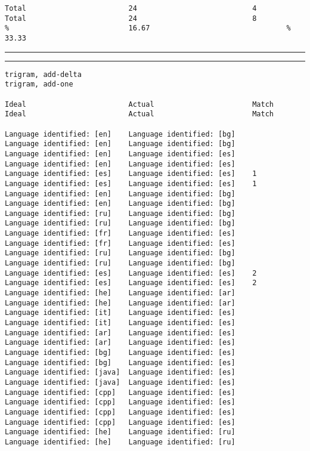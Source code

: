 \begin{verbatim}
Total                        24                           4       Total                        24                           8
%                            16.67                                %                            33.33
\end{verbatim}
\vskip4pt\hrule

\clearpage

\tiny
\hrule\vskip4pt
\begin{verbatim}
trigram, add-delta                                                trigram, add-one

Ideal                        Actual                       Match   Ideal                        Actual                       Match

Language identified: [en]    Language identified: [bg]            Language identified: [en]    Language identified: [bg]
Language identified: [en]    Language identified: [es]            Language identified: [en]    Language identified: [es]
Language identified: [es]    Language identified: [es]    1       Language identified: [es]    Language identified: [es]    1
Language identified: [en]    Language identified: [bg]            Language identified: [en]    Language identified: [bg]
Language identified: [ru]    Language identified: [bg]            Language identified: [ru]    Language identified: [bg]
Language identified: [fr]    Language identified: [es]            Language identified: [fr]    Language identified: [es]
Language identified: [ru]    Language identified: [bg]            Language identified: [ru]    Language identified: [bg]
Language identified: [es]    Language identified: [es]    2       Language identified: [es]    Language identified: [es]    2
Language identified: [he]    Language identified: [ar]            Language identified: [he]    Language identified: [ar]
Language identified: [it]    Language identified: [es]            Language identified: [it]    Language identified: [es]
Language identified: [ar]    Language identified: [es]            Language identified: [ar]    Language identified: [es]
Language identified: [bg]    Language identified: [es]            Language identified: [bg]    Language identified: [es]
Language identified: [java]  Language identified: [es]            Language identified: [java]  Language identified: [es]
Language identified: [cpp]   Language identified: [es]            Language identified: [cpp]   Language identified: [es]
Language identified: [cpp]   Language identified: [es]            Language identified: [cpp]   Language identified: [es]
Language identified: [he]    Language identified: [ru]            Language identified: [he]    Language identified: [ru]

\end{verbatim}
